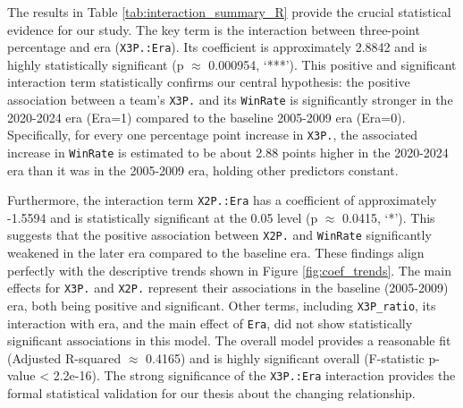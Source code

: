 \documentclass[11pt, a4paper]{article} %
\begin{document}
The results in Table \ref{tab:interaction_summary_R} provide the crucial statistical evidence for our study. 
The key term is the interaction between three-point percentage and era (\texttt{X3P.:Era}). Its coefficient is 
approximately 2.8842 and is highly statistically significant (p $\approx$ 0.000954, `***'). This positive and 
significant interaction term statistically confirms our central hypothesis: the positive association between a 
team's \texttt{X3P.} and its \texttt{WinRate} is significantly stronger in the 2020-2024 era (Era=1) compared to 
the baseline 2005-2009 era (Era=0). Specifically, for every one percentage point increase in \texttt{X3P.}, the 
associated increase in \texttt{WinRate} is estimated to be about 2.88 points higher in the 2020-2024 era than it 
was in the 2005-2009 era, holding other predictors constant.

Furthermore, the interaction term \texttt{X2P.:Era} has a coefficient of approximately -1.5594 and is statistically 
significant at the 0.05 level (p $\approx$ 0.0415, `*'). This suggests that the positive association between \texttt{X2P.} 
and \texttt{WinRate} significantly weakened in the later era compared to the baseline era. These findings align perfectly 
with the descriptive trends shown in Figure \ref{fig:coef_trends}. The main effects for \texttt{X3P.} and \texttt{X2P.} 
represent their associations in the baseline (2005-2009) era, both being positive and significant. Other terms, including 
\texttt{X3P\_ratio}, its interaction with era, and the main effect of \texttt{Era}, did not show statistically significant 
associations in this model. The overall model provides a reasonable fit (Adjusted R-squared $\approx$ 0.4165) and is 
highly significant overall (F-statistic p-value < 2.2e-16). The strong significance of the \texttt{X3P.:Era} interaction 
provides the formal statistical validation for our thesis about the changing relationship.
\end{document}

